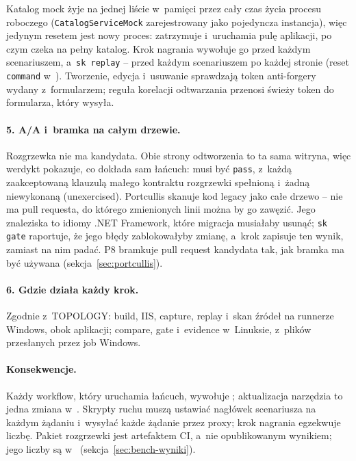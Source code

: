 Katalog mock żyje na jednej liście w~pamięci przez cały czas życia procesu roboczego
(\texttt{CatalogServiceMock} zarejestrowany jako pojedyncza instancja), więc jedynym
resetem jest nowy proces:  zatrzymuje i~uruchamia pulę
aplikacji, po czym czeka na pełny katalog. Krok nagrania wywołuje go przed każdym
scenariuszem, a~\texttt{sk replay} -- przed każdym scenariuszem po każdej stronie (reset
\texttt{command} w~). Tworzenie, edycja i~usuwanie
sprawdzają token anti-forgery wydany z~formularzem; reguła korelacji odtwarzania przenosi
świeży token do formularza, który wysyła.

\paragraph{5. A/A i~bramka na całym drzewie.} Rozgrzewka nie ma kandydata. Obie strony
odtworzenia to ta sama witryna, więc werdykt pokazuje, co dokłada sam łańcuch: musi być
\texttt{pass}, z~każdą zaakceptowaną klauzulą małego kontraktu rozgrzewki spełnioną
i~żadną niewykonaną (unexercised). Portcullis skanuje kod legacy jako całe drzewo -- nie
ma pull requesta, do którego zmienionych linii można by go zawęzić. Jego znaleziska to
idiomy .NET Framework, które migracja musiałaby usunąć; \texttt{sk gate} raportuje, że
jego błędy zablokowałyby zmianę, a~krok zapisuje ten wynik, zamiast na nim padać. P8
bramkuje pull request kandydata tak, jak bramka ma być używana
(sekcja~\ref{sec:portcullis}).

\paragraph{6. Gdzie działa każdy krok.} Zgodnie z~TOPOLOGY: build, IIS, capture, replay
i~skan źródeł na runnerze Windows, obok aplikacji; compare, gate i~evidence w~Linuksie,
z~plików przesłanych przez job Windows.

\paragraph{Konsekwencje.} Każdy workflow, który uruchamia łańcuch, wywołuje
; aktualizacja narzędzia to jedna zmiana w~. Skrypty
ruchu muszą ustawiać nagłówek scenariusza na każdym żądaniu i~wysyłać każde żądanie przez
proxy; krok nagrania egzekwuje liczbę. Pakiet rozgrzewki jest artefaktem CI, a~nie
opublikowanym wynikiem; jego liczby są w~ (sekcja~\ref{sec:bench-wyniki}).

